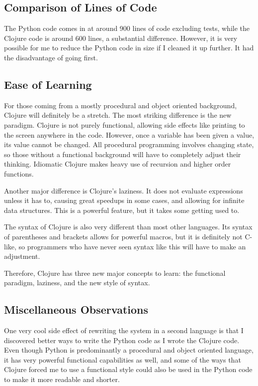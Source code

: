 \documentclass{article}
\begin{document}
\subsection{Comparison of Lines of Code}

The Python code comes in at around 900 lines of code excluding tests, while the Clojure code is around 600 lines, a substantial difference.  However, it is very possible for me to reduce the Python code in size if I cleaned it up further.  It had the disadvantage of going first.  

\subsection{Ease of Learning}

For those coming from a mostly procedural and object oriented background, Clojure will definitely be a stretch.  The most striking difference is the new paradigm.  Clojure is not purely functional, allowing side effects like printing to the screen anywhere in the code.  However, once a variable has been given a value, its value cannot be changed.  All procedural programming involves changing state, so those without a functional background will have to completely adjust their thinking.  Idiomatic Clojure makes heavy use of recursion and higher order functions.

Another major difference is Clojure's laziness.  It does not evaluate expressions unless it has to, causing great speedups in some cases, and allowing for infinite data structures.  This is a powerful feature, but it takes some getting used to.  

The syntax of Clojure is also very different than most other languages.  Its syntax of parentheses and brackets allows for powerful macros, but it is definitely not C-like, so programmers who have never seen syntax like this will have to make an adjustment.

Therefore, Clojure has three new major concepts to learn: the functional paradigm, laziness, and the new style of syntax.

\subsection{Miscellaneous Observations}

One very cool side effect of rewriting the system in a second language is that I discovered better ways to write the Python code as I wrote the Clojure code.  Even though Python is predominantly a procedural and object oriented language, it has very powerful functional capabilities as well, and some of the ways that Clojure forced me to use a functional style could also be used in the Python code to make it more readable and shorter.
\end{document}

